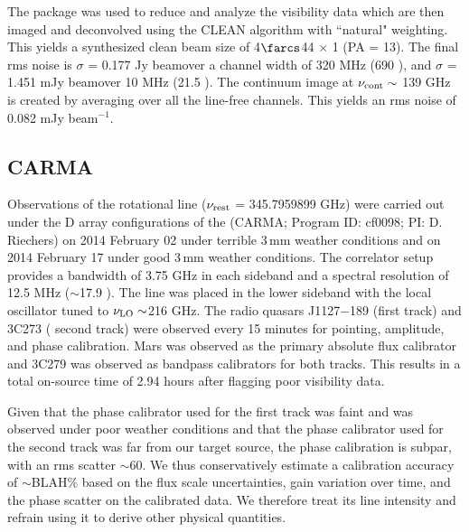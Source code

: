 \documentclass[]{emulateapj}
\begin{document}
The  package was used to reduce and analyze the visibility data
which are then imaged and deconvolved using the CLEAN algorithm with ``natural"
weighting. This yields a synthesized clean beam size of 4$\farcs$44 $\times$ 1 (PA = 13\degr). The final rms noise is $\sigma$ = 0.177 Jy \kms beam\pmOne over a channel width of 320 MHz (690 \kms), and $\sigma$ = 1.451 mJy \kms
beam\pmOne over 10 MHz (21.5 \kms). The continuum image at $\nu_{\rm cont}\sim$
139 GHz is created by averaging over all the line-free channels. This
yields an rms noise of 0.082 mJy beam$^{-1}$. %

\subsection{CARMA \cco}
Observations of the \cco rotational line ($\nu_{\rm rest}$ = 345.7959899 GHz)
were carried out under the D array configurations of the \carma (CARMA;
Program ID: cf0098; PI: D. Riechers) on 2014 February 02 under terrible 3\,mm
weather conditions and on 2014 February 17 under good 3\,mm
weather conditions. The correlator setup provides a bandwidth of 3.75 GHz in
each sideband and a spectral resolution of 12.5 MHz ($\sim$17.9 \kms). The
line was placed in the lower sideband with the local oscillator tuned to $\nu_{\rm LO}\sim$216 GHz. The radio quasars J1127$-$189 (first track) and 3C273 (
second track) were observed
every 15 minutes for pointing, amplitude, and phase calibration. Mars was
observed as the primary absolute flux calibrator and 3C279 was observed as
bandpass calibrators for both tracks. This results in a total on-source time of 2.94 hours after flagging poor
visibility data.

Given that the phase calibrator used for the first track was faint and was
observed under poor weather conditions and that the phase calibrator used for
the second track was far from our target source, the phase calibration is
subpar, with an rms scatter $\sim$60\degr. We thus conservatively estimate
a calibration accuracy of $\sim$BLAH\% based on the flux scale uncertainties,
gain variation over time, and the phase scatter on the calibrated data. We
therefore treat its line intensity and refrain using it to derive other physical quantities.
\end{document}
